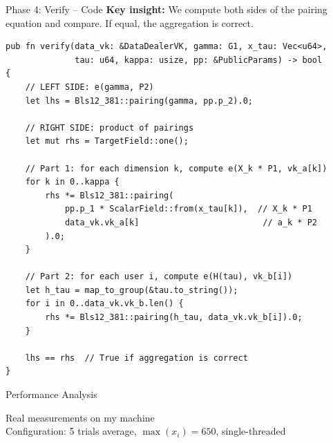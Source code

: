 \documentclass[aspectratio=169,10pt]{beamer}
\begin{document}
\begin{frame}[fragile]{Phase 4: Verify -- Code}
    \textbf{Key insight:} We compute both sides of the pairing equation and compare. If equal, the aggregation is correct.

    \vspace{0.3em}
\begin{lstlisting}[style=rust]
pub fn verify(data_vk: &DataDealerVK, gamma: G1, x_tau: Vec<u64>,
              tau: u64, kappa: usize, pp: &PublicParams) -> bool
{
    // LEFT SIDE: e(gamma, P2)
    let lhs = Bls12_381::pairing(gamma, pp.p_2).0;

    // RIGHT SIDE: product of pairings
    let mut rhs = TargetField::one();

    // Part 1: for each dimension k, compute e(X_k * P1, vk_a[k])
    for k in 0..kappa {
        rhs *= Bls12_381::pairing(
            pp.p_1 * ScalarField::from(x_tau[k]),  // X_k * P1
            data_vk.vk_a[k]                         // a_k * P2
        ).0;
    }

    // Part 2: for each user i, compute e(H(tau), vk_b[i])
    let h_tau = map_to_group(&tau.to_string());
    for i in 0..data_vk.vk_b.len() {
        rhs *= Bls12_381::pairing(h_tau, data_vk.vk_b[i]).0;
    }

    lhs == rhs  // True if aggregation is correct
}
\end{lstlisting}
\end{frame}

\begin{frame}{Performance Analysis}
    \begin{center}
    \end{center}

    \vspace{0.8cm}

    \begin{center}
        {\Large\textcolor{primary}{Real measurements on my machine}}\\[0.5em]
        {\small Configuration: 5 trials average, $\max(x_i) = 650$, single-threaded}
    \end{center}
\end{frame}
\end{document}
